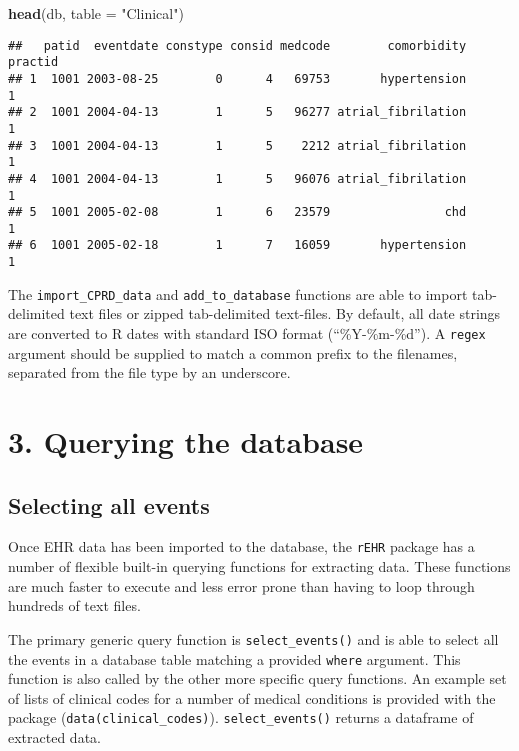 \documentclass[]{article}
\newenvironment{Shaded}{\begin{snugshade}}{\end{snugshade}}
\newcommand{\KeywordTok}[1]{\textcolor[rgb]{0.13,0.29,0.53}{\textbf{{#1}}}}
\newcommand{\DataTypeTok}[1]{\textcolor[rgb]{0.13,0.29,0.53}{{#1}}}
\newcommand{\StringTok}[1]{\textcolor[rgb]{0.31,0.60,0.02}{{#1}}}
\newcommand{\NormalTok}[1]{{#1}}
\begin{document}
\begin{Shaded}
\begin{Highlighting}[]
\KeywordTok{head}\NormalTok{(db, }\DataTypeTok{table =} \StringTok{"Clinical"}\NormalTok{)}
\end{Highlighting}
\end{Shaded}

\begin{verbatim}
##   patid  eventdate constype consid medcode        comorbidity practid
## 1  1001 2003-08-25        0      4   69753       hypertension       1
## 2  1001 2004-04-13        1      5   96277 atrial_fibrilation       1
## 3  1001 2004-04-13        1      5    2212 atrial_fibrilation       1
## 4  1001 2004-04-13        1      5   96076 atrial_fibrilation       1
## 5  1001 2005-02-08        1      6   23579                chd       1
## 6  1001 2005-02-18        1      7   16059       hypertension       1
\end{verbatim}

The \texttt{import\_CPRD\_data} and \texttt{add\_to\_database} functions
are able to import tab-delimited text files or zipped tab-delimited
text-files. By default, all date strings are converted to R dates with
standard ISO format (``\%Y-\%m-\%d''). A \texttt{regex} argument should
be supplied to match a common prefix to the filenames, separated from
the file type by an underscore.

\section{3. Querying the database}\label{querying-the-database}

\subsection{Selecting all events}\label{selecting-all-events}

Once EHR data has been imported to the database, the \texttt{rEHR}
package has a number of flexible built-in querying functions for
extracting data. These functions are much faster to execute and less
error prone than having to loop through hundreds of text files.

The primary generic query function is \texttt{select\_events()} and is
able to select all the events in a database table matching a provided
\texttt{where} argument. This function is also called by the other more
specific query functions. An example set of lists of clinical codes for
a number of medical conditions is provided with the package
(\texttt{data(clinical\_codes)}). \texttt{select\_events()} returns a
dataframe of extracted data.
\end{document}
